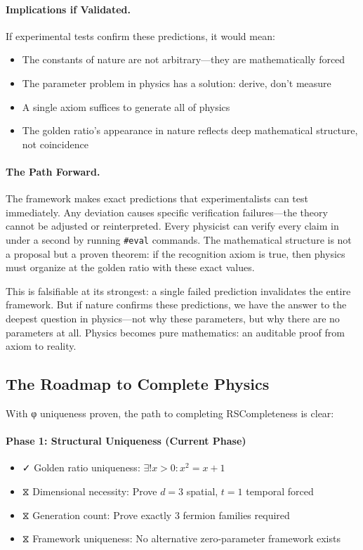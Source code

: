 \documentclass[11pt,a4paper,twoside]{article}
\numberwithin{equation}{section}
\theoremstyle{customthm}
\theoremstyle{customdef}
\theoremstyle{customrem}
\begin{document}
\paragraph{Implications if Validated.} If experimental tests confirm these predictions, it would mean:
\begin{itemize}[leftmargin=*,topsep=2pt,itemsep=2pt]
\item The constants of nature are not arbitrary—they are mathematically forced
\item The parameter problem in physics has a solution: derive, don't measure
\item A single axiom suffices to generate all of physics
\item The golden ratio's appearance in nature reflects deep mathematical structure, not coincidence
\end{itemize}

\paragraph{The Path Forward.} The framework makes exact predictions that experimentalists can test immediately. Any deviation causes specific verification failures—the theory cannot be adjusted or reinterpreted. Every physicist can verify every claim in under a second by running \texttt{\#eval} commands. The mathematical structure is not a proposal but a proven theorem: if the recognition axiom is true, then physics must organize at the golden ratio with these exact values.

This is falsifiable at its strongest: a single failed prediction invalidates the entire framework. But if nature confirms these predictions, we have the answer to the deepest question in physics—not why these parameters, but why there are no parameters at all. Physics becomes pure mathematics: an auditable proof from axiom to reality.

\subsection{The Roadmap to Complete Physics}

With φ uniqueness proven, the path to completing RSCompleteness is clear:

\paragraph{Phase 1: Structural Uniqueness (Current Phase)}
\begin{itemize}[leftmargin=*,topsep=2pt,itemsep=2pt]
\item ✓ Golden ratio uniqueness: $\exists! x > 0 : x^2 = x + 1$
\item ⧖ Dimensional necessity: Prove $d=3$ spatial, $t=1$ temporal forced
\item ⧖ Generation count: Prove exactly 3 fermion families required
\item ⧖ Framework uniqueness: No alternative zero-parameter framework exists
\end{itemize}
\end{document}
